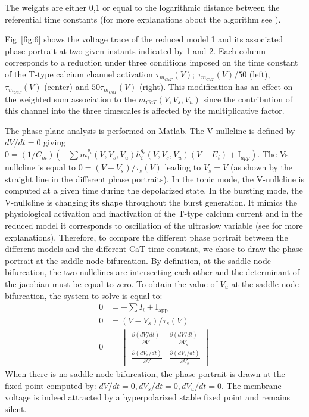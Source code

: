 The weights are either 0,1 or equal to the logarithmic distance between the referential time constants (for more explanations about the algorithm see \citep{drion_dynamic_2015}).

Fig~\ref{fig:6} shows the voltage trace of the reduced model 1 and its associated phase portrait at two given instants indicated by 1 and 2.  Each column corresponds to a reduction under three conditions imposed on the time constant of the T-type calcium channel activation $\tau_{m_{CaT}}(V)$;  $\tau_{m_{CaT}}(V)/50$ (left),  $\tau_{m_{CaT}}(V)$ (center) and  $50 \tau_{m_{CaT}}(V)$ (right).  This modification has an effect on the weighted sum association to the $m_{CaT}(V,V_s,V_u)$ since the contribution of this channel into the three timescales is affected by the multiplicative factor. 

The phase plane analysis is performed on Matlab. The V-nullcline is defined by $dV/dt =0$ giving $0 = (1/C_m) (-\sum m^{p_i}_i(V,V_s,V_u) h^{q_i}_i(V,V_s,V_u) (V-E_i)+ \text{I}_{app})$. The Vs-nullcline is equal to $0 = (V-V_s)/\tau_s(V)$ leading to $V_s=V$ (as shown by the straight line in the different phase portraits).  In the tonic mode, the V-nullcline is computed at a given time during the depolarized state.  In the bursting mode, the V-nullcline is changing its shape throughout the burst generation. It mimics the physiological activation and inactivation of the T-type calcium current and in the reduced model it corresponds to oscillation of the ultraslow variable (see \citep{drion_novel_2012} for more explanations).  Therefore, to compare the different phase portrait between the different models and the different CaT time constant, we chose to draw the phase portrait at the saddle node bifurcation.
By definition, at the saddle node bifurcation, the two nullclines are intersecting each other and the determinant of the jacobian must be equal to zero.  To obtain the value of $V_u$ at the saddle node bifurcation, the system to solve is equal to:
\[
\begin{array}{ll}
0&=-\sum I_i + \text{I}_{\text{app}}\\
0&=(V-V_s)/\tau_s(V)\\
0&=\begin{vmatrix}
\frac{\partial(dV/dt)}{\partial V} & \frac{\partial(dV/dt)}{\partial V_s} \\
\frac{\partial(dV_s/dt)}{\partial V} & \frac{\partial(dV_s/dt)}{\partial V_s}
\end{vmatrix}
\end{array}
\]
When there is no saddle-node bifurcation,  the phase portrait is drawn at the fixed point computed by: $dV/dt=0, dV_s/dt=0, dV_u/dt=0$. The membrane voltage is indeed attracted by a hyperpolarized stable fixed point and remains silent. 

